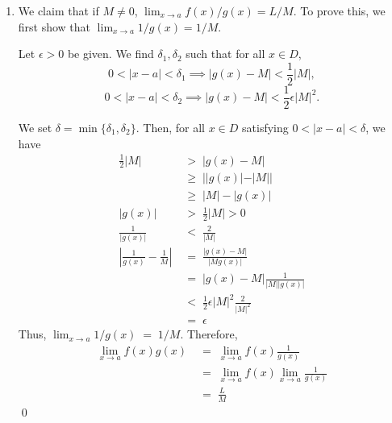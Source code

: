 \documentclass[10pt]{article}
\begin{document}
\begin{enumerate}
                \item We claim that if $M \neq 0$, $\lim_{x \to a} f(x)/ g(x) = L/M$.
                To prove this, we first show that $\lim_{x \to a} 1/ g(x) = 1/M$.

                Let $\epsilon > 0$ be given.
                We find $\delta_1, \delta_2$ such that for all $x \in D$,
                \[0 < |x - a| < \delta_1 \implies |g(x) - M| < \frac{1}{2}|M|,\]
                \[0 < |x - a| < \delta_2 \implies |g(x) - M| < \frac{1}{2}\epsilon |M|^2.\]
                
                We set $\delta = \min\{\delta_1, \delta_2\}$.
                Then, for all $x \in D$ satisfying $0 < |x - a| < \delta$, we have
                \begin{align*}
                        \frac{1}{2}|M| \;&>\; |g(x) - M| \\
                                \;&\ge\; | |g(x)| - |M| | \\
                                \;&\ge\; |M| - |g(x)| \\
                        |g(x)| \;&>\; \frac{1}{2}|M| > 0\\
                        \frac{1}{|g(x)|} \;&<\; \frac{2}{|M|} \\
                        \left| \frac{1}{g(x)} - \frac{1}{M} \right| \;&=\; \frac{|g(x) - M|}{|Mg(x)|} \\
                                \;&=\; |g(x) - M| \frac{1}{|M| |g(x)|} \\
                                \;&<\;  \frac{1}{2}\epsilon|M|^2 \frac{2}{|M|^2} \\
                                \;&=\; \epsilon
                \end{align*}
                Thus, $\lim_{x \to a} 1 /g(x) \;=\; 1 /M$.
                Therefore,
                \begin{align*}
                        \lim_{x \to a} {f(x)}{g(x)} \;&=\; \lim_{x \to a} f(x) \frac{1}{g(x)}\\
                                \;&=\; \lim_{x \to a} f(x) \lim_{x \to a} \frac{1}{g(x)} \\
                                \;&=\; \frac{L}{M}
                \end{align*}\qed
        \end{enumerate}
\end{document}
